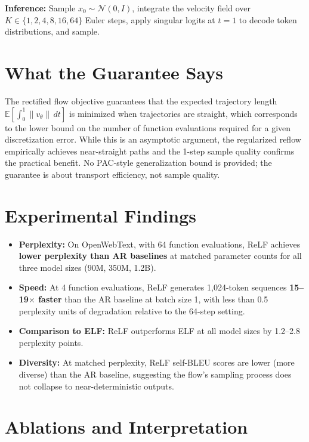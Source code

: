 \documentclass[10pt,twocolumn]{article}
\begin{document}
\textbf{Inference:} Sample $x_0 \sim \mathcal{N}(0, I)$, integrate
the velocity field over $K \in \{1, 2, 4, 8, 16, 64\}$ Euler steps,
apply singular logits at $t = 1$ to decode token distributions, and
sample.

\section{What the Guarantee Says}

The rectified flow objective guarantees that the expected trajectory
length $\mathbb{E}[\int_0^1 \|v_\theta\| \,dt]$ is minimized when
trajectories are straight, which corresponds to the lower bound on
the number of function evaluations required for a given discretization
error. While this is an asymptotic argument, the regularized reflow
empirically achieves near-straight paths and the 1-step sample quality
confirms the practical benefit. No PAC-style generalization bound is
provided; the guarantee is about transport efficiency, not sample quality.

\section{Experimental Findings}

\begin{itemize}[itemsep=2pt,parsep=0pt]
  \item \textbf{Perplexity:} On OpenWebText, with 64 function
    evaluations, ReLF achieves \textbf{lower perplexity than AR
    baselines} at matched parameter counts for all three model sizes
    (90M, 350M, 1.2B).
  \item \textbf{Speed:} At 4 function evaluations, ReLF generates
    1,024-token sequences \textbf{15--19$\times$ faster} than the AR
    baseline at batch size 1, with less than 0.5 perplexity units of
    degradation relative to the 64-step setting.
  \item \textbf{Comparison to ELF:} ReLF outperforms ELF at all model
    sizes by 1.2--2.8 perplexity points.
  \item \textbf{Diversity:} At matched perplexity, ReLF self-BLEU
    scores are lower (more diverse) than the AR baseline, suggesting
    the flow's sampling process does not collapse to near-deterministic
    outputs.
\end{itemize}

\section{Ablations and Interpretation}
\end{document}
